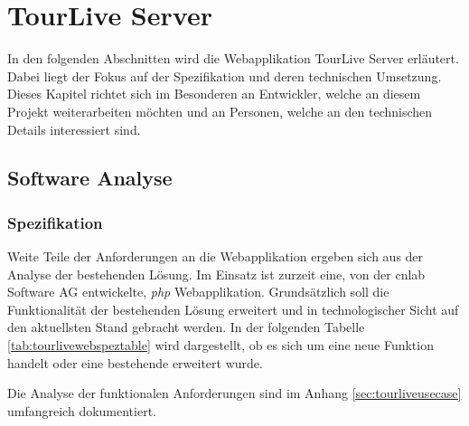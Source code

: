 \chapter{TourLive Server}
\label{sec:tourliveserver}
In den folgenden Abschnitten wird die Webapplikation TourLive Server erläutert. Dabei liegt der Fokus auf der Spezifikation und deren technischen Umsetzung. Dieses Kapitel richtet sich im Besonderen an Entwickler, welche an diesem Projekt weiterarbeiten möchten und an Personen, welche an den technischen Details interessiert sind.

\section{Software Analyse}
\subsection{Spezifikation}
Weite Teile der Anforderungen an die Webapplikation ergeben sich aus der Analyse der bestehenden Lösung. Im Einsatz ist zurzeit eine, von der cnlab Software AG entwickelte, \textit{\gls{php}} Webapplikation. Grundsätzlich soll die Funktionalität der bestehenden Lösung erweitert und in technologischer Sicht auf den aktuellsten Stand gebracht werden. In der folgenden Tabelle \ref{tab:tourlivewebspeztable} wird dargestellt, ob es sich um eine neue Funktion handelt oder eine bestehende erweitert wurde.

Die Analyse der funktionalen Anforderungen sind im Anhang \ref{sec:tourliveusecase} umfangreich dokumentiert.

